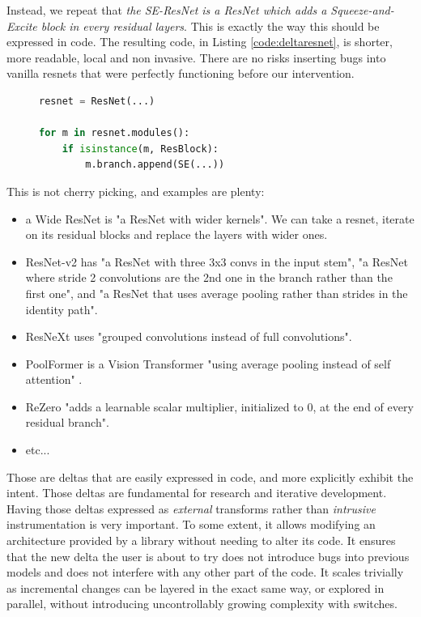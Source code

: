 Instead, we repeat that \emph{the SE-ResNet is a ResNet which adds a Squeeze-and-Excite block in every residual layers}. This is exactly the way this should be expressed in code. The resulting code, in Listing \ref{code:deltaresnet}, is shorter, more readable, local and non invasive. There are no risks inserting bugs into vanilla resnets that were perfectly functioning before our intervention.

\begin{figure}
\begin{lstlisting}[language=Python, label=code:deltaresnet, caption=Delta implementation of SE-ResNet. There are no needs for intrusive changes.]
resnet = ResNet(...)

for m in resnet.modules():
    if isinstance(m, ResBlock):
        m.branch.append(SE(...))
\end{lstlisting}
\end{figure}


This is not cherry picking, and examples are plenty:
\begin{itemize}
    \item a Wide ResNet \cite{wrn} is "a ResNet with wider kernels". We can take a resnet, iterate on its residual blocks and replace the layers with wider ones.
    \item ResNet-v2 \cite{resnettricks} has "a ResNet with three 3x3 convs in the input stem", "a ResNet where stride 2 convolutions are the 2nd one in the branch rather than the first one", and "a ResNet that uses average pooling rather than strides in the identity path".
    \item ResNeXt \cite{resnext} uses "grouped convolutions instead of full convolutions".
    \item PoolFormer \cite{poolformer} is a Vision Transformer \cite{vit} "using average pooling instead of self attention" \cite{transformers}.
    \item ReZero \cite{rezero} "adds a learnable scalar multiplier, initialized to 0, at the end of every residual branch".
    \item etc...
\end{itemize}

Those are deltas that are easily expressed in code, and more explicitly exhibit the intent. Those deltas are fundamental for research and iterative development. Having those deltas expressed as \emph{external} transforms rather than \emph{intrusive} instrumentation is very important. To some extent, it allows modifying an architecture provided by a library without needing to alter its code. It ensures that the new delta the user is about to try does not introduce bugs into previous models and does not interfere with any other part of the code. It scales trivially as incremental changes can be layered in the exact same way, or explored in parallel, without introducing uncontrollably growing complexity with switches.

